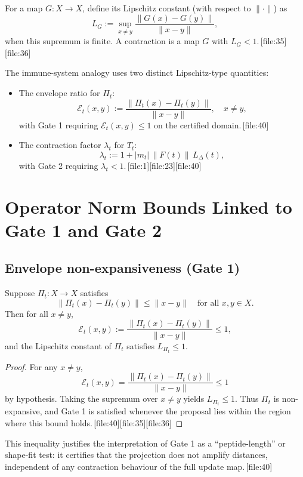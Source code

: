 \documentclass[11pt]{article}
\begin{document}
For a map \(G:X\to X\), define its Lipschitz constant (with respect to \(\|\cdot\|\)) as
\[
L_G := \sup_{x\neq y} \frac{\|G(x)-G(y)\|}{\|x-y\|},
\]
when this supremum is finite.
A contraction is a map \(G\) with \(L_G<1\).\,[file:35][file:36]

The immune-system analogy uses two distinct Lipschitz-type quantities:
\begin{itemize}
  \item The envelope ratio for \(\Pi_t\):
  \[
  \mathcal{E}_t(x,y) := \frac{\|\Pi_t(x)-\Pi_t(y)\|}{\|x-y\|},\quad x\ne y,
  \]
  with Gate 1 requiring \(\mathcal{E}_t(x,y)\le 1\) on the certified domain.\,[file:40]
  \item The contraction factor \(\lambda_t\) for \(T_t\):
  \[
  \lambda_t := 1 + |m_t|\,\|F(t)\|\,L_{\Delta}(t),
  \]
  with Gate 2 requiring \(\lambda_t<1\).\,[file:1][file:23][file:40]
\end{itemize}

\section{Operator Norm Bounds Linked to Gate 1 and Gate 2}

\subsection{Envelope non-expansiveness (Gate 1)}

\begin{lemma}
Suppose \(\Pi_t:X\to X\) satisfies
\[
\|\Pi_t(x)-\Pi_t(y)\| \le \|x-y\|\quad\text{for all }x,y\in X.
\]
Then for all \(x\ne y\),
\[
\mathcal{E}_t(x,y) := \frac{\|\Pi_t(x)-\Pi_t(y)\|}{\|x-y\|} \le 1,
\]
and the Lipschitz constant of \(\Pi_t\) satisfies \(L_{\Pi_t}\le 1\).
\end{lemma}

\begin{proof}
For any \(x\ne y\),
\[
\mathcal{E}_t(x,y) = \frac{\|\Pi_t(x)-\Pi_t(y)\|}{\|x-y\|} \le 1
\]
by hypothesis.
Taking the supremum over \(x\ne y\) yields \(L_{\Pi_t} \le 1\).
Thus \(\Pi_t\) is non-expansive, and Gate 1 is satisfied whenever the proposal lies within the region where this bound holds.\,[file:40][file:35][file:36]
\end{proof}

This inequality justifies the interpretation of Gate 1 as a “peptide-length” or shape-fit test: it certifies that the projection does not amplify distances, independent of any contraction behaviour of the full update map.\,[file:40]
\end{document}
